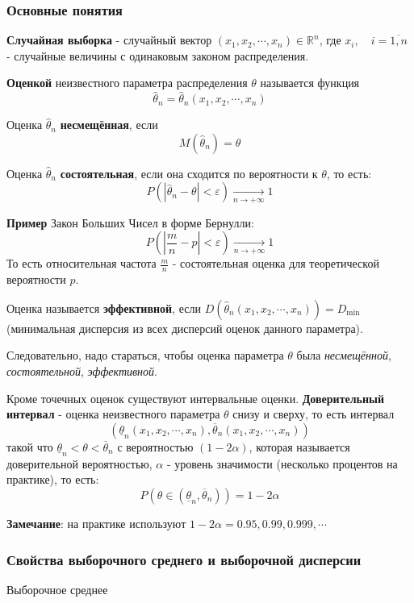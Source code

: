 \documentclass[12pt, a4paper]{article}
\begin{document}
\subsubsection{Основные понятия}
\textbf{Случайная выборка} - случайный вектор $(x_1, x_2, \cdots, x_n) \in \mathbb{R}^n$, где $x_i, \quad i = \overline{1, n}$ - случайные величины с одинаковым законом распределения.

\textbf{Оценкой} неизвестного параметра распределения $\theta$ называется функция
\[\hat{\theta}_n = \hat{\theta}_n(x_1, x_2, \cdots, x_n) \]

Оценка $\hat{\theta}_n$ \textbf{несмещённая}, если
\[M(\hat{\theta}_n) = \theta \]

Оценка $\hat{\theta}_n$ \textbf{состоятельная}, если она сходится по вероятности к $\theta$, то есть:
\[P(|\hat{\theta}_n - \theta| < \varepsilon) \xrightarrow[n \to +\infty]{} 1 \]

\textbf{Пример} Закон Больших Чисел в форме Бернулли:
\[P(| \frac{m}{n} - p| < \varepsilon) \xrightarrow[n \to +\infty]{} 1 \]
То есть относительная частота $\frac{m}{n}$ - состоятельная оценка для теоретической вероятности $p$.

Оценка называется \textbf{эффективной}, если $D(\hat{\theta}_n(x_1, x_2, \cdots, x_n)) = D_{\min}$ (минимальная дисперсия из всех дисперсий оценок данного параметра).

Следовательно, надо стараться, чтобы оценка параметра $\theta$ была \textit{несмещённой}, \textit{состоятельной}, \textit{эффективной}.

Кроме точечных оценок существуют интервальные оценки. \textbf{Доверительный интервал} - оценка неизвестного параметра $\theta$ снизу и сверху, то есть интервал
\[(\underline{\theta}_n(x_1, x_2, \cdots, x_n), \overline{\theta}_n(x_1, x_2, \cdots, x_n)) \]
такой что $\underline{\theta}_n < \theta < \overline{\theta}_n$ с вероятностью $(1-2\alpha)$, которая называется доверительной вероятностью, $\alpha$ - уровень значимости (несколько процентов на практике), то есть:
\[P(\theta \in (\underline{\theta}_n, \overline{\theta}_n)) = 1-2\alpha \]

\textbf{Замечание}: на практике используют $1-2\alpha = 0.95, 0.99, 0.999, \cdots$

\subsubsection{Свойства выборочного среднего и выборочной дисперсии}
\begin{center}
\begin{Large}
Выборочное среднее
\end{Large}
\end{center}
\end{document}
